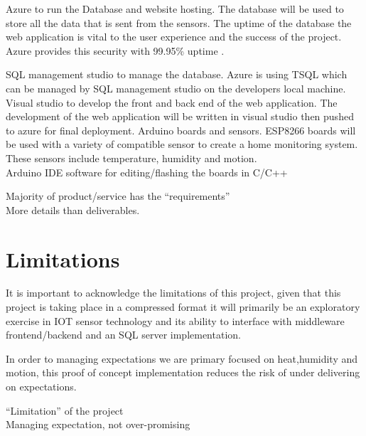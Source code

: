 \documentclass{article}
\begin{document}
        Azure to run the Database and website hosting. The database will be used to store all the data that is 
        sent from the sensors. The uptime of the database the web application is vital to the user experience 
        and the success of the project. Azure provides this security with 99.95\% uptime \cite{AzureUptime}.
        \par
        SQL management studio to manage the database. Azure is using TSQL which can be managed by SQL management studio 
        on the developers local machine. Visual studio to develop the front and back end of the web application. 
        The development of the web application will be written in visual studio then pushed to azure for final deployment.
        Arduino boards and sensors. ESP8266 boards will be used with a variety of compatible sensor to create a home 
        monitoring system. These sensors include temperature, humidity and motion.\\
        Arduino IDE software for editing/flashing the boards in C/C++

    
        Majority of product/service has the “requirements”\\
        More details than deliverables.

    \section{Limitations}
        It is important to acknowledge the limitations of this project, given that this project is taking place 
        in a compressed format it will primarily be an exploratory exercise in IOT sensor technology and its 
        ability to interface with middleware frontend/backend and an SQL server implementation.
        \par
        In order to managing expectations we are primary focused on heat,humidity and motion, this proof of 
        concept implementation reduces the risk of under delivering on expectations.

        “Limitation” of the project\\
        Managing expectation, not over-promising

        \newpage
\end{document}
